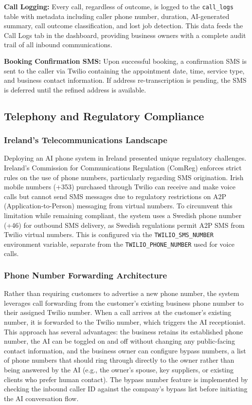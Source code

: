 \documentclass[conference]{IEEEtran}
\begin{document}
\textbf{Call Logging:} Every call, regardless of outcome, is logged to the \texttt{call\_logs} table with metadata including caller phone number, duration, AI-generated summary, call outcome classification, and lost job detection. This data feeds the Call Logs tab in the dashboard, providing business owners with a complete audit trail of all inbound communications.

\textbf{Booking Confirmation SMS:} Upon successful booking, a confirmation SMS is sent to the caller via Twilio containing the appointment date, time, service type, and business contact information. If address re-transcription is pending, the SMS is deferred until the refined address is available.

\subsection{Telephony and Regulatory Compliance}

\subsubsection{Ireland's Telecommunications Landscape}

Deploying an AI phone system in Ireland presented unique regulatory challenges. Ireland's Commission for Communications Regulation (ComReg) enforces strict rules on the use of phone numbers, particularly regarding SMS origination. Irish mobile numbers (+353) purchased through Twilio can receive and make voice calls but cannot send SMS messages due to regulatory restrictions on A2P (Application-to-Person) messaging from virtual numbers. To circumvent this limitation while remaining compliant, the system uses a Swedish phone number (+46) for outbound SMS delivery, as Swedish regulations permit A2P SMS from Twilio virtual numbers. This is configured via the \texttt{TWILIO\_SMS\_NUMBER} environment variable, separate from the \texttt{TWILIO\_PHONE\_NUMBER} used for voice calls.

\subsubsection{Phone Number Forwarding Architecture}

Rather than requiring customers to advertise a new phone number, the system leverages call forwarding from the customer's existing business phone number to their assigned Twilio number. When a call arrives at the customer's existing number, it is forwarded to the Twilio number, which triggers the AI receptionist. This approach has several advantages: the business retains its established phone number, the AI can be toggled on and off without changing any public-facing contact information, and the business owner can configure bypass numbers, a list of phone numbers that should ring through directly to the owner rather than being answered by the AI (e.g., the owner's spouse, key suppliers, or existing clients who prefer human contact). The bypass number feature is implemented by checking the inbound caller ID against the company's bypass list before initiating the AI conversation flow.
\end{document}
